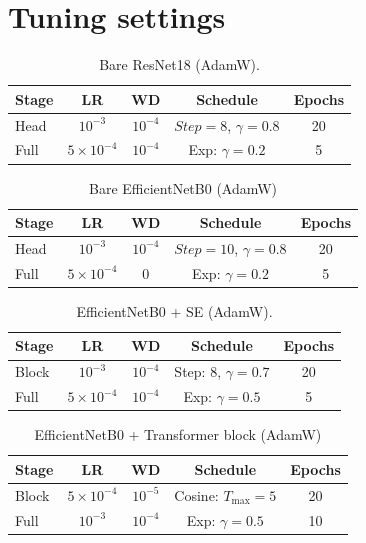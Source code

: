 \documentclass{article}
\begin{document}
\section{Tuning settings}
\label{app:settings}
\begin{table}[H]
\centering
\begin{tabular}{lcccc}
\toprule
\textbf{Stage} & \textbf{LR}  & \textbf{WD} & \textbf{Schedule} & \textbf{Epochs} \\
\midrule
Head
& $10^{-3}$ & $10^{-4}$
& $Step=8$, $\gamma=0.8$
& 20 \\
Full
& $5{\times}10^{-4}$ & $10^{-4}$
& Exp: $\gamma=0.2$
& 5 \\
\bottomrule
\end{tabular}
\caption{Bare ResNet18 (AdamW).}
\label{tab:resnet_training_schedule}
\end{table}
\begin{table}[H]
\centering
\begin{tabular}{lcccc}
\toprule
\textbf{Stage} & \textbf{LR}  & \textbf{WD} & \textbf{Schedule} & \textbf{Epochs} \\
\midrule
Head
& $10^{-3}$ & $10^{-4}$
& $Step=10$, $\gamma=0.8$
& 20 \\
Full
& $5{\times}10^{-4}$ & $0$
& Exp: $\gamma=0.2$
& 5 \\
\bottomrule
\end{tabular}
\caption{Bare EfficientNetB0 (AdamW)}
\label{tab:efficientnet_training_schedule}
\end{table}

\begin{table}[H]
\centering
\begin{tabular}{lcccc}
\toprule
\textbf{Stage} & \textbf{LR} & \textbf{WD} & \textbf{Schedule} & \textbf{Epochs}\\ 
\midrule
Block
& $10^{-3}$
& $10^{-4}$
& Step: $8$, $\gamma=0.7$
& 20 \\
Full
& $5{\times}10^{-4}$
& $10^{-4}$
& Exp: $\gamma=0.5$
& 5 \\
\bottomrule
\end{tabular}
\caption{EfficientNetB0 + SE (AdamW).}
\label{tab:efficientnet_se_training_schedule}
\end{table}

\begin{table}[H]
\centering
\begin{tabular}{lcccc}
\toprule
\textbf{Stage} & \textbf{LR} & \textbf{WD} & \textbf{Schedule} & \textbf{Epochs}\\ 
\midrule
Block
& $5{\times}10^{-4}$
& $10^{-5}$
& Cosine: $T_{\max}=5$
& 20 \\
Full
& $10^{-3}$
& $10^{-4}$
& Exp: $\gamma=0.5$
& 10 \\
\bottomrule
\end{tabular}
\caption{EfficientNetB0 + Transformer block (AdamW)}
\label{tab:efficientnet_mha_training_schedule}
\end{table}
\end{document}

